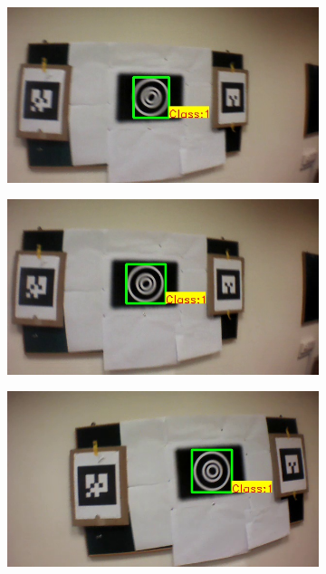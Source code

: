 \documentclass[runningheads]{llncs}
\begin{document}
\begin{figure}
\begin{subfigure}[b]{.19\textwidth}
\includegraphics[width=\linewidth]{output11.jpg}
\end{subfigure}
\begin{subfigure}[b]{.19\textwidth}
\includegraphics[width=\linewidth]{output12.jpg}
\end{subfigure}
\begin{subfigure}[b]{.19\textwidth}
\includegraphics[width=\linewidth]{output13.jpg}

\end{subfigure}
\end{figure}
\end{document}
